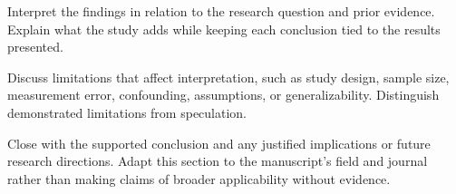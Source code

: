 Interpret the findings in relation to the research question and prior evidence. Explain what the study adds while keeping each conclusion tied to the results presented.

Discuss limitations that affect interpretation, such as study design, sample size, measurement error, confounding, assumptions, or generalizability. Distinguish demonstrated limitations from speculation.

Close with the supported conclusion and any justified implications or future research directions. Adapt this section to the manuscript's field and journal rather than making claims of broader applicability without evidence.

